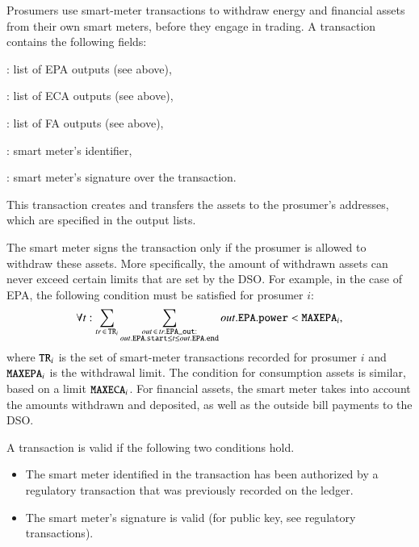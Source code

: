 Prosumers use smart-meter transactions to withdraw energy and financial assets from their own smart meters, before they engage in trading.
%
A transaction contains the following fields:
\begin{compactitem}
\item {}: list of EPA outputs (see above),
\item {}: list of ECA outputs (see above),
\item {}: list of FA outputs (see above),
\item {}: smart meter's identifier,
\item {}: smart meter's signature over the transaction.
\end{compactitem}
This transaction creates and transfers the assets to the prosumer's addresses, which are specified in the output lists.

The smart meter signs the transaction only if the prosumer is allowed to withdraw these assets.
More specifically, the amount of withdrawn assets can never exceed certain limits that are set by the DSO.
For example, in the case of EPA, the following condition must be satisfied for prosumer $i$:
\begin{equation}
\forall t: \sum_{tr \,\in\, \texttt{TR}_i} \sum_{\substack{out \,\in\, tr.\texttt{EPA\_out}:\\out.\texttt{EPA}.\texttt{start} \leq t \leq out.\texttt{EPA}.\texttt{end}}} out.\texttt{EPA}.\texttt{power} < \texttt{MAXEPA}_i ,
\end{equation}
where $\texttt{TR}_i$ is the set of smart-meter transactions recorded for prosumer $i$ and $\texttt{MAXEPA}_i$ is the withdrawal limit.
The condition for consumption assets is similar, based on a limit $\texttt{MAXECA}_i$.
For financial assets, the smart meter takes into account the amounts withdrawn and deposited, as well as the outside bill payments to the DSO.

A transaction is valid if the following two conditions hold.
\begin{itemize}[noitemsep,topsep=-\parskip]
\item The smart meter identified in the transaction has been authorized by a regulatory transaction that was previously recorded on the ledger.
\item The smart meter's signature is valid (for public key, see regulatory transactions).
\end{itemize}

